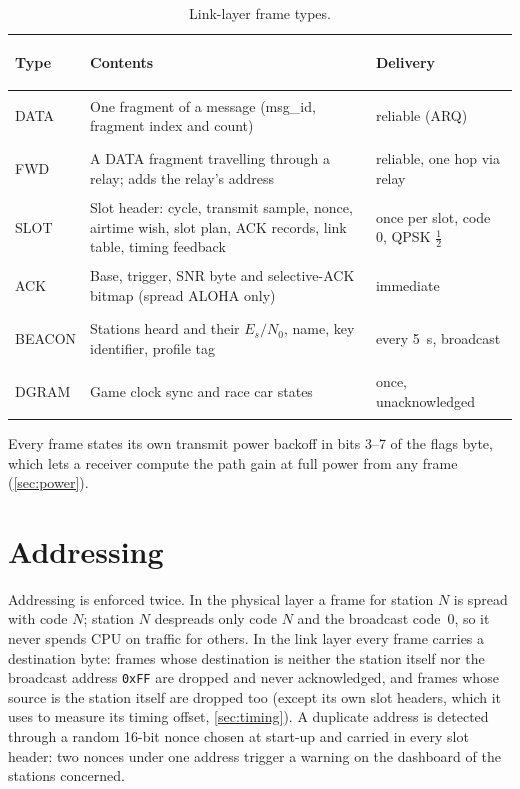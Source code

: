 \documentclass[11pt,a4paper,oneside]{report}
\newcommand{\code}[1]{\texttt{\small #1}}
\newcommand{\EsNo}{\ensuremath{E_s/N_0}}
\begin{document}
\begin{table}[htbp]
\centering\small
\caption{Link-layer frame types.}\label{tab:frames}
\begin{tabularx}{\linewidth}{@{}>{\bfseries\sffamily\raggedright\arraybackslash}p{16mm}L>{\raggedright\arraybackslash}p{38mm}@{}}
\toprule
Type & Contents & Delivery\\
\midrule
DATA & One fragment of a message (msg\_id, fragment index and count) & reliable (ARQ)\\
FWD & A DATA fragment travelling through a relay; adds the relay's address & reliable, one hop via relay\\
SLOT & Slot header: cycle, transmit sample, nonce, airtime wish, slot plan, ACK records, link table, timing feedback & once per slot, code 0, QPSK $\tfrac12$\\
ACK & Base, trigger, SNR byte and selective-ACK bitmap (spread ALOHA only) & immediate\\
BEACON & Stations heard and their \EsNo, name, key identifier, profile tag & every \SI{5}{s}, broadcast\\
DGRAM & Game clock sync and race car states & once, unacknowledged\\
\bottomrule
\end{tabularx}
\end{table}

Every frame states its own transmit power backoff in bits 3--7 of the flags byte, which lets a receiver
compute the path gain at full power from any frame (\cref{sec:power}).

\section{Addressing}\label{sec:addr}
Addressing is enforced twice. In the physical layer a frame for station $N$ is spread with code
$N$; station $N$ despreads only code $N$ and the broadcast code~0, so it never spends CPU on traffic
for others. In the link layer every frame carries a destination byte: frames whose destination is
neither the station itself nor the broadcast address \code{0xFF} are dropped and never
acknowledged, and frames whose source is the station itself are dropped too (except its own slot
headers, which it uses to measure its timing offset, \cref{sec:timing}). A duplicate address is
detected through a random 16-bit nonce chosen at start-up and carried in every slot header: two
nonces under one address trigger a warning on the dashboard of the stations concerned.
\end{document}
